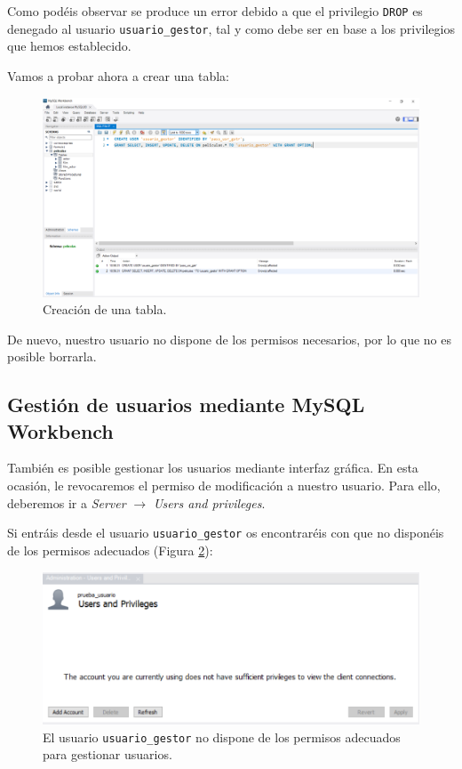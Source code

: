 \documentclass[a4paper]{article}
\begin{document}
Como podéis observar se produce un error debido a que el privilegio \texttt{DROP} es denegado al usuario \texttt{usuario\_gestor}, tal y como debe ser en base a los privilegios que hemos establecido.

Vamos a probar ahora a crear una tabla:


\begin{figure}[H]
    \centering
    \includegraphics[width=\textwidth]{figs/gestion-usuarios/creacion_usr.PNG}
    \caption{Creación de una tabla.}
    \label{fig:crear}
\end{figure}

De nuevo, nuestro usuario no dispone de los permisos necesarios, por lo que no es posible borrarla.

\subsection*{Gestión de usuarios mediante MySQL Workbench}

También es posible gestionar los usuarios mediante interfaz gráfica. En esta ocasión, le revocaremos el permiso de modificación a nuestro usuario. Para ello, deberemos ir a \textit{Server} $\rightarrow$ \textit{Users and privileges}.

Si entráis desde el usuario \texttt{usuario\_gestor} os encontraréis con que no disponéis de los permisos adecuados (Figura \ref{fig:gestor-usuario}):

\begin{figure}[H]
    \centering
    \includegraphics[width=1\linewidth]{figs/gestion-usuarios/gestion-no-permisos.png}
    \caption{El usuario \texttt{usuario\_gestor} no dispone de los permisos adecuados para gestionar usuarios.}
    \label{fig:gestor-usuario}
\end{figure}
\end{document}
